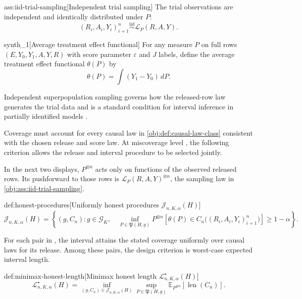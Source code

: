 \documentclass[11pt]{article}
\begin{document}
\begin{assumptionv}{ass:iid-trial-sampling}[Independent trial sampling]
The trial observations are independent and identically distributed under \(P\):
\[
(R_i,A_i,Y_i)_{i=1}^n\stackrel{\mathrm{iid}}{\sim}\mathcal L_P(R,A,Y).
\]
\end{assumptionv}

\begin{definitionv}{synth_1}[Average treatment effect functional]
For any measure \(P\) on full rows \((E,Y_0,Y_1,A,Y,R)\) with score parameter \(\varepsilon\) and \(J\) labels, define the average treatment effect functional \(\theta(P)\) by
\[
\theta(P)=\int (Y_1-Y_0)\,dP.
\]
\end{definitionv}

Independent superpopulation sampling governs how the released-row law generates the trial data and is a standard condition for interval inference in partially identified models \citep{ImbensManski2004}.

Coverage must account for every causal law in \cref{obj:def:causal-law-class} consistent with the chosen release and score law. At miscoverage level , the following criterion allows the release and interval procedure to be selected jointly.

In the next two displays, \(P^{\otimes n}\) acts only on functions of the observed released rows. Its pushforward to those rows is \(\mathcal L_P(R,A,Y)^{\otimes n}\), the sampling law in \cref{obj:ass:iid-trial-sampling}.

\begin{definitionv}{def:honest-procedures}[Uniformly honest procedures $\mathcal J_{n,K,\alpha}(H)$]
\[
\mathcal J_{n,K,\alpha}(H)
=
\left\{
(g,C_n):
g\in\mathcal G_K,\quad
\inf_{P\in\mathfrak P(H,g)}
P^{\otimes n}\!\left[
\theta(P)\in C_n\bigl((R_i,A_i,Y_i)_{i=1}^n\bigr)
\right]
\ge 1-\alpha
\right\}.
\]
\end{definitionv}

For each pair in , the interval  attains the stated coverage uniformly over causal laws for its release. Among these pairs, the design criterion is worst-case expected interval length.

\begin{definitionv}{def:minimax-honest-length}[Minimax honest length $\mathcal L^\star_{n,K,\alpha}(H)$]
\[
\mathcal L^\star_{n,K,\alpha}(H)
=
\inf_{(g,C_n)\in\mathcal J_{n,K,\alpha}(H)}
\sup_{P\in\mathfrak P(H,g)}
\mathbb E_{P^{\otimes n}}\!\left[\operatorname{len}(C_n)\right].
\]
\end{definitionv}
\end{document}
